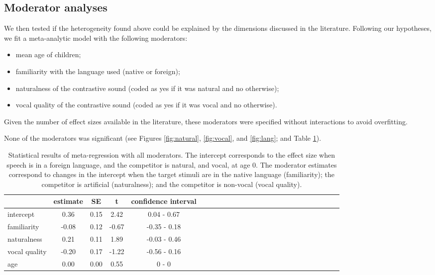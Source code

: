 \documentclass[man]{apa6}
\providecommand{\tightlist}{%
  \setlength{\itemsep}{0pt}\setlength{\parskip}{0pt}}
\begin{document}
\subsection{Moderator analyses}\label{moderator-analyses}

We then tested if the heterogeneity found above could be explained by
the dimensions discussed in the literature. Following our hypotheses, we
fit a meta-analytic model with the following moderators:

\begin{itemize}
\tightlist
\item
  mean age of children;
\item
  familiarity with the language used (native or foreign);
\item
  naturalness of the contrastive sound (coded as yes if it was natural
  and no otherwise);
\item
  vocal quality of the contrastive sound (coded as yes if it was vocal
  and no otherwise).
\end{itemize}

Given the number of effect sizes available in the literature, these
moderators were specified without interactions to avoid overfitting.

None of the moderators was significant (see Figures \ref{fig:natural},
\ref{fig:vocal}, and \ref{fig:lang}; and Table \ref{tab:Table2}).

\begin{table}[tbp]
\begin{center}
\begin{threeparttable}
\caption{\label{tab:Table2}Statistical results of meta-regression with all moderators. The intercept corresponds to the effect size when speech is in a foreign language, and the competitor is natural, and vocal, at age 0. The moderator estimates correspond to changes in the intercept when the target stimuli are in the native language (familiarity); the competitor is artificial (naturalness); and the competitor is non-vocal (vocal quality).}
\begin{tabular}{lcccclcccclcccclcccclcccc}
\toprule
 & estimate & SE & t & confidence interval\\
\midrule
intercept & 0.36 & 0.15 & 2.42 & 0.04 - 0.67\\
familiarity & -0.08 & 0.12 & -0.67 & -0.35 - 0.18\\
naturalness & 0.21 & 0.11 & 1.89 & -0.03 - 0.46\\
vocal quality & -0.20 & 0.17 & -1.22 & -0.56 - 0.16\\
age & 0.00 & 0.00 & 0.55 & 0 - 0\\
\bottomrule
\end{tabular}
\end{threeparttable}
\end{center}
\end{table}
\end{document}
